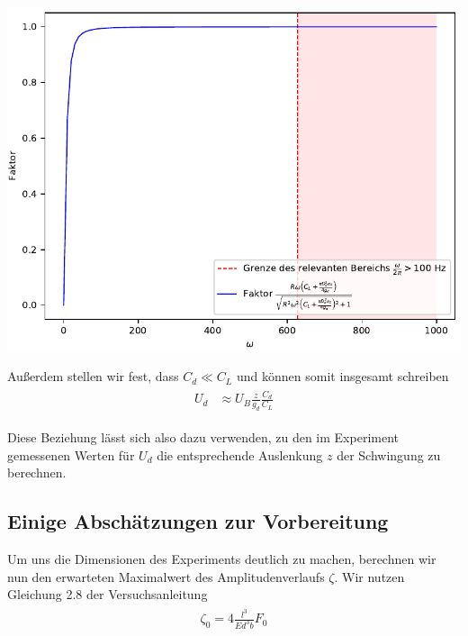 \minipage{\linewidth}
    \begin{center}
        \captionsetup{type=figure}
        \begin{adjustbox}{max width=\linewidth, keepaspectratio}
            \includegraphics[]{pdf/Faktor}
        \end{adjustbox}
        \label{fig:Faktor}
    \end{center}
\endminipage

Außerdem stellen wir fest, dass $C_d \ll C_L$ und können somit insgesamt schreiben
\begin{align}
    \label{eq:DetektionselektrodeVereinfacht}
    \begin{split}
        U_d &\approx U_B \frac{z}{g_d} \frac{C_d}{C_L}
    \end{split}
\end{align}

Diese Beziehung lässt sich also dazu verwenden, zu den im Experiment gemessenen Werten für $U_d$ die entsprechende Auslenkung $z$ der Schwingung zu berechnen.

\subsection{Einige Abschätzungen zur Vorbereitung}

Um uns die Dimensionen des Experiments deutlich zu machen, berechnen wir nun den erwarteten Maximalwert des Amplitudenverlaufs $\zeta$.
Wir nutzen Gleichung 2.8 der Versuchsanleitung
\begin{align}
    \label{eq:MaximaleAmplitude}
    \begin{split}
        \zeta_0 = 4 \frac{l^3}{Ed^3b} F_0
    \end{split}
\end{align}

